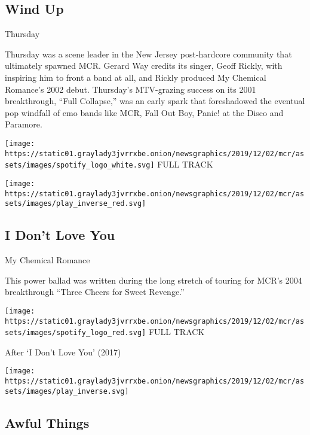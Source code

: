 \hypertarget{wind-up}{%
\subsection{Wind Up}\label{wind-up}}

Thursday

Thursday was a scene leader in the New Jersey post-hardcore community
that ultimately spawned MCR. Gerard Way credits its singer, Geoff
Rickly, with inspiring him to front a band at all, and Rickly produced
My Chemical Romance's 2002 debut. Thursday's MTV-grazing success on its
2001 breakthrough, ``Full Collapse,'' was an early spark that
foreshadowed the eventual pop windfall of emo bands like MCR, Fall Out
Boy, Panic! at the Disco and Paramore.

\href{https://open.spotify.com/track/0VVqlllv4UZfSJpAAhVnnP?si=dZ0fhDPLSlSKWbn5gJAROA}{}

\texttt{[image: https://static01.graylady3jvrrxbe.onion/newsgraphics/2019/12/02/mcr/assets/images/spotify\_logo\_white.svg]}
FULL TRACK

\texttt{[image: https://static01.graylady3jvrrxbe.onion/newsgraphics/2019/12/02/mcr/assets/images/play\_inverse\_red.svg]}

\hypertarget{i-dont-love-you-1}{%
\subsection{I Don't Love You}\label{i-dont-love-you-1}}

My Chemical Romance

This power ballad was written during the long stretch of touring for
MCR's 2004 breakthrough ``Three Cheers for Sweet Revenge.''

\href{https://open.spotify.com/track/4RAOI1etsgbh5NP3T5R8rN?si=b-0FLjOUSQWNeNf67XPZ_Q}{}

\texttt{[image: https://static01.graylady3jvrrxbe.onion/newsgraphics/2019/12/02/mcr/assets/images/spotify\_logo\_red.svg]}
FULL TRACK

After `I Don't Love You' (2017)

\texttt{[image: https://static01.graylady3jvrrxbe.onion/newsgraphics/2019/12/02/mcr/assets/images/play\_inverse.svg]}

\hypertarget{awful-things}{%
\subsection{Awful Things}\label{awful-things}}

